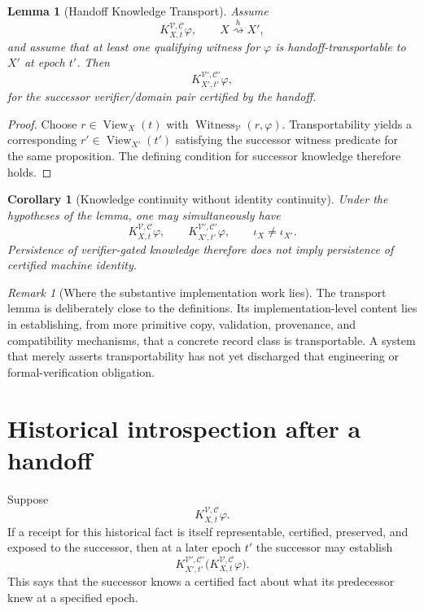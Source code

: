 \documentclass[11pt]{article}
\newtheorem{corollary}[definition]{Corollary}
\newtheorem{lemma}[definition]{Lemma}
\theoremstyle{remark}
\newtheorem{remark}[definition]{Remark}
\newcommand{\View}{\operatorname{View}}
\newcommand{\Witness}{\operatorname{Witness}}
\newcommand{\K}[4]{K^{#3,#4}_{#1,#2}}
\newcommand{\handoff}{\mathrel{\overset{h}{\rightsquigarrow}}}
\begin{document}
\begin{lemma}[Handoff Knowledge Transport]
Assume
\[
\K{X}{t}{\mathcal V}{\mathcal C}\varphi,
\qquad X\handoff X',
\]
and assume that at least one qualifying witness for $\varphi$ is handoff-transportable to $X'$ at epoch $t'$. Then
\[
\K{X'}{t'}{\mathcal V'}{\mathcal C'}\varphi,
\]
for the successor verifier/domain pair certified by the handoff.
\end{lemma}
\begin{proof}
Choose $r\in\View_X(t)$ with $\Witness_{\mathcal V}(r,\varphi)$. Transportability yields a corresponding $r'\in\View_{X'}(t')$ satisfying the successor witness predicate for the same proposition. The defining condition for successor knowledge therefore holds.
\end{proof}

\begin{corollary}[Knowledge continuity without identity continuity]
Under the hypotheses of the lemma, one may simultaneously have
\[
\K{X}{t}{\mathcal V}{\mathcal C}\varphi,
\qquad
\K{X'}{t'}{\mathcal V'}{\mathcal C'}\varphi,
\qquad
\iota_X\neq\iota_{X'}.
\]
Persistence of verifier-gated knowledge therefore does not imply persistence of certified machine identity.
\end{corollary}

\begin{remark}[Where the substantive implementation work lies]
The transport lemma is deliberately close to the definitions. Its implementation-level content lies in establishing, from more primitive copy, validation, provenance, and compatibility mechanisms, that a concrete record class is transportable. A system that merely asserts transportability has not yet discharged that engineering or formal-verification obligation.
\end{remark}

\section{Historical introspection after a handoff}

Suppose
\[
\K{X}{t}{\mathcal V}{\mathcal C}\varphi.
\]
If a receipt for this historical fact is itself representable, certified, preserved, and exposed to the successor, then at a later epoch $t'$ the successor may establish
\[
\K{X'}{t'}{\mathcal V'}{\mathcal C'}
\bigl(\K{X}{t}{\mathcal V}{\mathcal C}\varphi\bigr).
\]
This says that the successor knows a certified fact about what its predecessor knew at a specified epoch.
\end{document}
